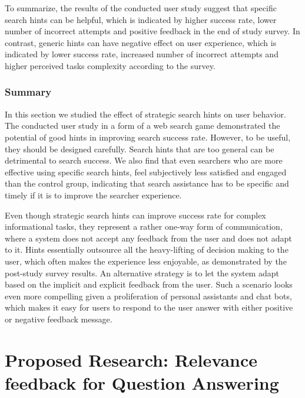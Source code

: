 To summarize, the results of the conducted user study suggest that specific search hints can be helpful, which is indicated by higher success rate, lower number of incorrect attempts and positive feedback in the end of study survey.
In contrast, generic hints can have negative effect on user experience, which is indicated by lower success rate, increased number of incorrect attempts and higher perceived tasks complexity according to the survey.

\subsubsection{Summary}
\label{section:users:hints:summary}

In this section we studied the effect of strategic search hints on user behavior. 
The conducted user study in a form of a web search game demonstrated the potential of good hints in improving search success rate.
However, to be useful, they should be designed carefully.
Search hints that are too general can be detrimental to search success.
We also find that even searchers who are more effective using specific search hints, feel subjectively less satisfied and engaged than the control group, indicating that search assistance has to be specific and timely if it is to improve the searcher experience.

Even though strategic search hints can improve success rate for complex informational tasks, they represent a rather one-way form of communication, where a system does not accept any feedback from the user and does not adapt to it.
Hints essentially outsource all the heavy-lifting of decision making to the user, which often makes the experience less enjoyable, as demonstrated by the post-study survey results.
An alternative strategy is to let the system adapt based on the implicit and explicit feedback from the user.
Such a scenario looks even more compelling given a proliferation of personal assistants and chat bots, which makes it easy for users to respond to the user answer with either positive or negative feedback message.


\section{Proposed Research: Relevance feedback for Question Answering}
\label{section:users:proposal}


